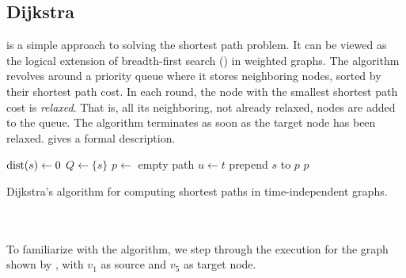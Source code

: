 \subsection{Dijkstra}
	\dijkstra {} is a simple approach to solving the shortest path problem. It can be viewed
	as the logical extension of breadth-first search (\bfs)  in weighted graphs. The algorithm
	revolves around a priority queue where it stores neighboring nodes, sorted by their shortest path cost.
	In each round, the node with the smallest shortest path cost is \textit{relaxed}. That is, all its neighboring,
	not already relaxed, nodes are added to the queue. The algorithm terminates as soon as the target node has been relaxed.
	 gives a formal description.
	\IncMargin{1em}
	\begin{algorithm}
		\BlankLine
		\BlankLine
		\BlankLine
		$\operatorname{dist}(s) \leftarrow 0$\;
		$Q \leftarrow \{s\}$\;
		\BlankLine
		\BlankLine
		$p \leftarrow$ empty path\;
		$u \leftarrow t$\;
		prepend $s$ to $p$\;
		\Return $p$\;
		\BlankLine
		\caption{Dijkstra's algorithm for computing shortest paths in time-independent graphs.}\label{dijkstra}
	\end{algorithm}\DecMargin{1em}\quad\\\\
	To familiarize with the algorithm, we step through the execution for the graph shown by ,
	with $v_1$ as source and $v_5$ as target node.
	
